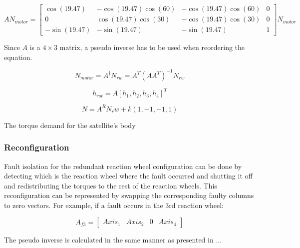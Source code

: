 \begin{equation}
A N_{motor}  = 
\begin{bmatrix}
\cos(19.47)       & -\cos(19.47) \cos(60)  &  -\cos(19.47) \cos(60)  & 0 \\
0       & \cos(19.47) \cos(30)  &  -\cos(19.47) \cos(30)  & 0 \\
-\sin(19.47)       & -\sin(19.47)   &  -\sin(19.47)   & 1
\end{bmatrix} N_{motor}
\end{equation}

Since $A$ is a $ 4 \times 3 $ matrix, a pseudo inverse has to be used when reordering the equation.

\begin{equation}
N_{motor} = A ^\dagger N_{rw}   =  A^T  (A A ^T)^{-1} N_{rw}
\end{equation}


\cite[equation 18.41-42]{SADC}
\cite{reactionWheelConfigThesis}

\begin{equation}
h_{rot} = A\left[ h_1, h_2, h_3, h_4 \right]^T
\end{equation}

\begin{equation}
N = A^R \textbf{$N_rw$} + k\left(1,-1,-1,1\right)
\end{equation}


The torque demand for the satellite's body

\subsubsection{Reconfiguration}

Fault isolation for the redundant reaction wheel configuration can be done by detecting which is the reaction wheel where the fault occurred and shutting it off and redistributing the torques to the rest of the reaction wheels. This reconfiguration can be represented by swapping the corresponding faulty columns to zero vectors. For example, if a fault occurs in the 3rd reaction wheel:

\begin{equation}
A_{f3} = \begin{bmatrix}
Axis_{1}       & Axis_{2}  & 0  & Axis_{4} 
\end{bmatrix}
\end{equation}

The pseudo inverse is calculated in the same manner as presented in ... 



